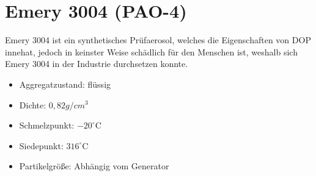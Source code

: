 \section{Emery 3004 (PAO-4)}
Emery 3004 ist ein synthetisches Pr\"{u}faerosol, welches die Eigenschaften von DOP innehat, jedoch in keinster Weise sch\"{a}dlich f\"{u}r den Menschen ist, weshalb sich Emery 3004 in der Industrie durchsetzen konnte.
\begin{itemize}
\item Aggregatzustand: fl\"{u}ssig
\item Dichte: \(0,82 g/cm^3\)
\item Schmelzpunkt: \(-20^\circ\text{C}\)
\item Siedepunkt: \(316^\circ\text{C}\)
\item Partikelgr\"{o}{\ss}e: Abh\"{a}ngig vom Generator
\end{itemize}